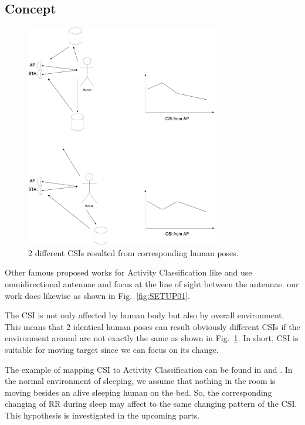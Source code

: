 \documentclass[10pt,letterpaper]{article}
\begin{document}
	
	\subsection*{Concept}
	\label{concept}
	
	\begin{figure}[htbp]
		
		\centerline{\includegraphics[width=85mm,scale=0.5]{ESP32CSI03.png}}
		\caption{2 different CSIs resulted from corresponding human poses.}
		\label{fig:ESP32CSI02}
	\end{figure}
	
	Other famous proposed works for Activity Classification like \cite{wangF} \cite{liuJ} and \cite{hernandezSM} use omnidirectional antennae and focus at the line of sight between  the antennae. our work does likewise as shown in Fig.~\ref{fig:SETUP01}.
	
	
	The CSI is not only affected by human body but also by overall environment. This means that 2 identical human poses can result obviously different CSIs if the environment around are not exactly the same as shown in Fig.~\ref{fig:ESP32CSI02}. In short, CSI is suitable for moving target since we can focus on its change.
	
	 The example of mapping CSI to Activity Classification can be found in \cite{chowdhuryTZ} and \cite{zouH}. In the normal environment of sleeping, we assume that nothing in the room is moving besides an alive sleeping human on the bed. So, the corresponding changing of RR during sleep may affect to the same changing pattern of the CSI. This hypothesis is investigated in the upcoming parts.
	
\end{document}
